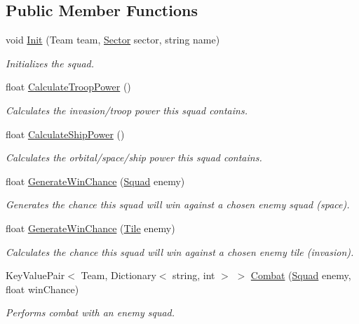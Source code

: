 \subsection*{Public Member Functions}
\begin{DoxyCompactItemize}
\item 
void \hyperlink{class_squad_a0fe0a369f21fabbbedd489fe9d58b7e7}{Init} (Team team, \hyperlink{class_sector}{Sector} sector, string name)
\begin{DoxyCompactList}\small\item\em Initializes the squad. \end{DoxyCompactList}\item 
float \hyperlink{class_squad_a5bafa1bfe9a68d968b0e1ca92266f893}{Calculate\+Troop\+Power} ()
\begin{DoxyCompactList}\small\item\em Calculates the invasion/troop power this squad contains. \end{DoxyCompactList}\item 
float \hyperlink{class_squad_a309ffcca0c76b9ddc31ca53fa94bff6b}{Calculate\+Ship\+Power} ()
\begin{DoxyCompactList}\small\item\em Calculates the orbital/space/ship power this squad contains. \end{DoxyCompactList}\item 
float \hyperlink{class_squad_aa9cd04052f829090b5af2d075947bc77}{Generate\+Win\+Chance} (\hyperlink{class_squad}{Squad} enemy)
\begin{DoxyCompactList}\small\item\em Generates the chance this squad will win against a chosen enemy squad (space). \end{DoxyCompactList}\item 
float \hyperlink{class_squad_a2a1c29eeab5e513a2cebc0df96b9e495}{Generate\+Win\+Chance} (\hyperlink{class_tile}{Tile} enemy)
\begin{DoxyCompactList}\small\item\em Calculates the chance this squad will win against a chosen enemy tile (invasion). \end{DoxyCompactList}\item 
Key\+Value\+Pair$<$ Team, Dictionary$<$ string, int $>$ $>$ \hyperlink{class_squad_a6b567c39426bab25b702b7cbcc830237}{Combat} (\hyperlink{class_squad}{Squad} enemy, float win\+Chance)
\begin{DoxyCompactList}\small\item\em Performs combat with an enemy squad. \end{DoxyCompactList}\item 

\end{DoxyCompactItemize}
